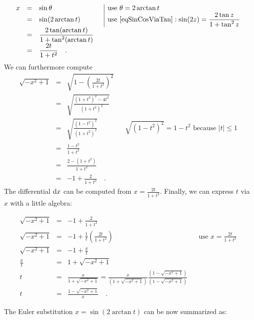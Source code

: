 \documentclass[12pt]{book}
\begin{document}
\begin{equation*}
\begin{array}{rcll|l}
x&=&\displaystyle \sin \theta &&\text{use } \theta=2\arctan t\\
&=&\displaystyle \sin (2\arctan t) &&\text{use } \eqref{eqSinCosViaTan}: \displaystyle \sin (2z) = \frac{ 2 \tan z}{1+ \tan^2 z}\\
&=&\displaystyle \frac{2\tan(\arctan t)}{1+\tan^2( \arctan t)} \\
&=&\displaystyle \frac{2t}{1+t^2} \quad .
\end{array}
\end{equation*}
We can furthermore compute
\begin{equation}\label{eqsqrt1minusxsquaredE1}
\begin{array}{rcll|l}
\sqrt{-x^2+1 }&=&\displaystyle \sqrt{1- \left(\frac{2t}{1+t^2}\right)^2}\\
&=&\displaystyle \sqrt{\frac{(1+t^2)^2-4t^2}{(1+t^2)^2} }\\
&=&\displaystyle \sqrt{\frac{(1-t^2)^2}{(1+t^2)^2}} &&\displaystyle \sqrt{(1-t^2)^2}=1-t^2\text{ because } |t|\leq 1\\
&=&\displaystyle \frac{1-t^2}{1+t^2}\\
&=&\displaystyle \frac{2-(1+t^2) }{1+t^2}\\
&=&\displaystyle -1+\frac{2}{1+t^2}\quad .
\end{array}
\end{equation}
The differential ${\normalfont \text{d}} x$ can be computed from $x=\frac{2t}{1+t^2}$. Finally, we can express $t$ via $x$ with a little algebra:

\[
\begin{array}{rcll|l}
\displaystyle \sqrt{-x^2+1}&=&\displaystyle -1 + \frac{2}{ 1+ t^2} \\
\displaystyle \sqrt{-x^2+1}&=& \displaystyle  -1 +\frac{1 }{t} \left( \frac{2t}{1+t^2}\right) &&\text{use } x= \frac{2t}{1+t^2}\\
\displaystyle \sqrt{-x^2+1}&=&\displaystyle -1 +\frac{x}{t} \\
\displaystyle \frac{x}{t}&=&1+\displaystyle \sqrt{-x^2+1}\\
t&=&\displaystyle \frac{x}{1+\sqrt{-x^2+1}} =\frac{x}{(1+\sqrt{-x^2+1})} \frac{(1-\sqrt{- x^2+ 1})}{(1 - \sqrt{ -x^2+1})} \\
t&=&\displaystyle \frac{ 1-\sqrt{-x^2+1}}{x} \quad .
\end{array}
\]

The Euler substitution $x= \sin (2\arctan t)$ can be now summarized as:
\end{document}
